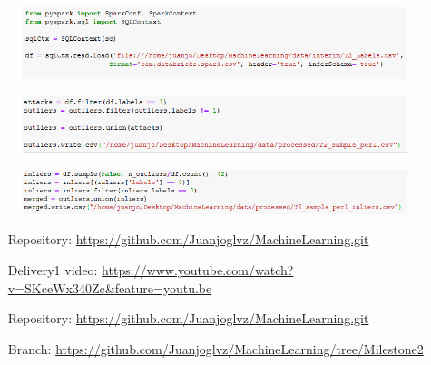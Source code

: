 \documentclass[idxtotoc,hyperref,openany]{labbook} %
\begin{document}
\begin{figure}[h]
\includegraphics[width=0.9\linewidth]{Milestone3/Spark/leer.png}
\setlength\belowcaptionskip{-10pt}
\caption{}
\label{leer Spark}
\end{figure}
\begin{figure}[h]
\includegraphics[width=0.9\linewidth]{Milestone3/Spark/escribir.png}
\setlength\belowcaptionskip{-10pt}
\caption{}
\label{escribir Spark}
\end{figure}
\begin{figure}[h]
\includegraphics[width=0.9\linewidth]{Milestone3/Spark/sample.png}
\setlength\belowcaptionskip{-10pt}
\caption{}
\label{sample Spark}
\end{figure}


\begin{itemize}
\item[Repository:] \href{https://github.com/Juanjoglvz/MachineLearning.git}{https://github.com/Juanjoglvz/MachineLearning.git}
\item[Delivery1 video:] \href{https://www.youtube.com/watch?v=SKceWx340Zc\&feature=youtu.be}{https://www.youtube.com/watch?v=SKceWx340Zc\&feature=youtu.be}
\end{itemize}

\begin{itemize}
\item[Repository:] \href{https://github.com/Juanjoglvz/MachineLearning.git}{https://github.com/Juanjoglvz/MachineLearning.git}
\item[Branch:] \href{https://github.com/Juanjoglvz/MachineLearning/tree/Milestone2}{https://github.com/Juanjoglvz/MachineLearning/tree/Milestone2}
\end{itemize}
\end{document}
